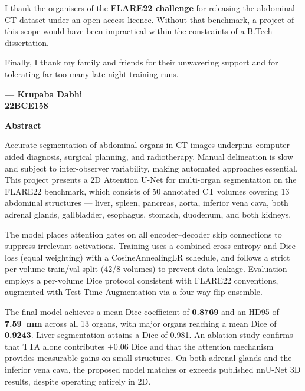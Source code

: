 \noindent
I thank the organisers of the \textbf{FLARE22 challenge} for releasing the abdominal CT dataset
under an open-access licence. Without that benchmark, a project of this scope would have been
impractical within the constraints of a B.Tech dissertation.

\noindent
Finally, I thank my family and friends for their unwavering support and for tolerating far too many
late-night training runs.

\vspace{2cm}
\begin{flushright}
\textbf{--- Krupaba Dabhi}\\
\textbf{22BCE158}
\end{flushright}

\newpage
{}
\begin{center}
{\Large \bf Abstract}\\
\end{center}
\vspace{10pt}

\noindent
Accurate segmentation of abdominal organs in CT images underpins computer-aided diagnosis,
surgical planning, and radiotherapy. Manual delineation is slow and subject to inter-observer
variability, making automated approaches essential. This project presents a 2D Attention U-Net for
multi-organ segmentation on the FLARE22 benchmark, which consists of 50 annotated CT volumes
covering 13 abdominal structures --- liver, spleen, pancreas, aorta, inferior vena cava, both
adrenal glands, gallbladder, esophagus, stomach, duodenum, and both kidneys.

\noindent
The model places attention gates on all encoder--decoder skip connections to suppress irrelevant
activations. Training uses a combined cross-entropy and Dice loss (equal weighting) with a
CosineAnnealingLR schedule, and follows a strict per-volume train/val split (42/8 volumes) to
prevent data leakage. Evaluation employs a per-volume Dice protocol consistent with FLARE22
conventions, augmented with Test-Time Augmentation via a four-way flip ensemble.

\noindent
The final model achieves a mean Dice coefficient of \textbf{0.8769} and an HD95 of
\textbf{7.59~mm} across all 13 organs, with major organs reaching a mean Dice of \textbf{0.9243}.
Liver segmentation attains a Dice of 0.981. An ablation study confirms that TTA alone contributes
$+$0.06 Dice and that the attention mechanism provides measurable gains on small structures. On
both adrenal glands and the inferior vena cava, the proposed model matches or exceeds published
nnU-Net 3D results, despite operating entirely in 2D.

